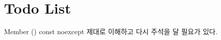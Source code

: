 \chapter{Todo List}
\hypertarget{todo}{}\label{todo}

\begin{DoxyRefList}
\item[Member \doxylink{class___static_array___iterator_a9f60585aee993553d391b925d5200d2c}{\+\_\+\+Static\+Array\+\_\+\+Iterator\texorpdfstring{$<$}{<} T, Size \texorpdfstring{$>$}{>}\+::operator-\/\texorpdfstring{$>$}{>}} () const noexcept]\label{todo__todo000001}%
%
제대로 이해하고 다시 주석을 달 필요가 있다. 
\end{DoxyRefList}